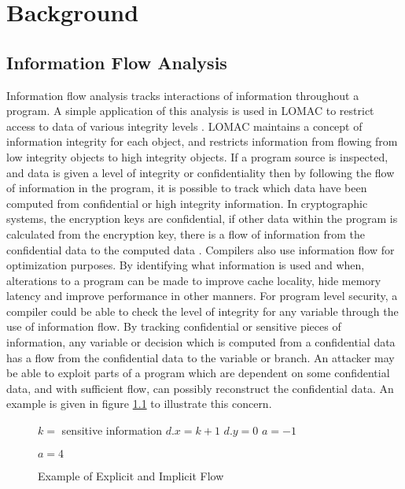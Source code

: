 \chapter{Background}
\section{Information Flow Analysis}
Information flow analysis tracks interactions of information throughout a
program. A simple application of this analysis is used in LOMAC to restrict
access to data of various integrity levels \cite{fraser2000lomac}. LOMAC
maintains a concept of information integrity for each object, and restricts
information from flowing from low integrity objects to high integrity objects.
If a program source is inspected, and data is given a level of integrity or
confidentiality then by following the flow of information in the program, it is
possible to track which data have been computed from confidential or high
integrity information. In cryptographic systems, the encryption keys are
confidential, if other data within the program is calculated from the encryption
key, there is a flow of information from the confidential data to the computed
data \cite{wang2017cached}. Compilers also use information flow for optimization
purposes. By identifying what information is used and when, alterations to a
program can be made to improve cache locality, hide memory latency and improve
performance in other manners. For program level security, a compiler could be
able to check the level of integrity for any variable through the use of
information flow. By tracking confidential or sensitive pieces of information,
any variable or decision which is computed from a confidential data has a flow
from the confidential data to the variable or branch. An attacker may be able to
exploit parts of a program which are dependent on some confidential data, and
with sufficient flow, can possibly reconstruct the confidential data. An example
is given in figure \ref{alg:simpleflow} to illustrate this concern.

\begin{figure}
  \hrulefill
  \begin{algorithmic}
    \State $k =$ sensitive information
    \State $d.x =  k + 1$
    \State $d.y = 0$
    \State $a = -1$

      \State $a = 4$ 
    \EndIf

  \end{algorithmic}
  \hrulefill
  \caption{Example of Explicit and Implicit Flow}
  \label{alg:simpleflow}
\end{figure}

